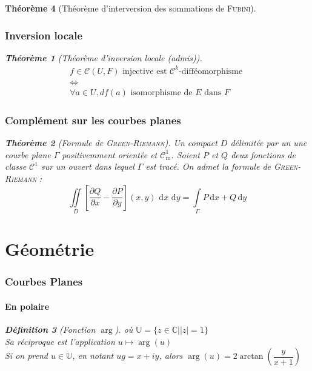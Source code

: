 \documentclass[11pt,a4paper]{report}
\newtheorem{theorem}{Théorème}[chapter]
\newtheorem{itheorem}[theorem]{Théorème}
\theoremstyle{definition}
\newtheorem{dfn}[theorem]{Définition}
\newcommand{\CM}{\mathcal{C}_{\mathrm{m}}}
\begin{document}
\begin{theorem}[Théorème d'interversion des sommations de \textsc{Fubini}]
{{\section{Inversion locale}
\begin{itheorem}[Théorème d'inversion locale \textit{(admis)}]
\[
\begin{array}{c}
f \in \mathcal{C}(U,F)\text{ injective est }\mathcal{C}^k\text{-difféomorphisme } \\ 
    \Leftrightarrow \\
 \forall a \in U, df(a) \text{ isomorphisme de }E\text{ dans }F
\end{array}
\]
\end{itheorem}

\section{Complément sur les courbes planes} %
\label{sec:complement_sur_les_courbes_planes}
\begin{theorem}[Formule de \textsc{Green}-\textsc{Riemann}]
	 Un compact $D$ délimitée par un une courbe plane $\Gamma$ positivemment orientée et $\CM^1$. Soient $P$ et $Q$ deux fonctions de classe $\mathcal{C}^1$ sur un ouvert dans lequel $\Gamma$ est tracé. On admet la formule de \textsc{Green}-\textsc{Riemann} : 
	 \begin{equation}
	 \iint \limits_D \left[ \dfrac{\partial Q}{\partial x} - \dfrac{\partial P}{\partial y}\right](x,y) \, \,\mathrm{d} x\, \,\mathrm{d} y = \int \limits_\Gamma P\,\mathrm{d} x + Q \,\mathrm{d} y
	 \end{equation}
\end{theorem}

\part{Géométrie} 
\section{Courbes Planes}
\subsection{En polaire}
\begin{dfn}[Fonction $\arg$]
\ibox{$\theta \mapsto e^{i\theta}$ est une bijection de $]-\pi , \pi [$ sur $\mathbb{U}\backslash \lbrace -1 \rbrace$} où $\mathbb{U}=\lbrace z \in \ensuremath{\mathbb{C}} | |z| = 1 \rbrace $\\
Sa réciproque est l'application $u \mapsto \arg(u)$\\
Si on prend $u \in \mathbb{U}$, en notant $ug=x+iy$, alors $\arg(u)=2\arctan \left( \dfrac{y}{x+1} \right)
$
\end{dfn}

}}
\end{theorem}
\end{document}
